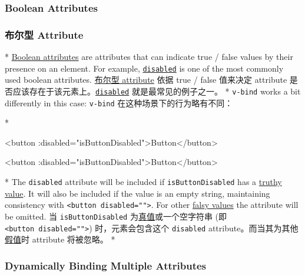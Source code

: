 \begin{paracol}{2}
\subsubsection{Boolean Attributes}
\switchcolumn
\subsubsection{布尔型 Attribute}
\switchcolumn[0]*%
\href{https://html.spec.whatwg.org/multipage/common-microsyntaxes.html\#boolean-attributes}{Boolean
attributes} are attributes that can indicate true / false values by
their presence on an element. For example,
\href{https://developer.mozilla.org/en-US/docs/Web/HTML/Attributes/disabled}{\texttt{disabled}}
is one of the most commonly used boolean attributes.
\switchcolumn
\href{https://developer.mozilla.org/zh-CN/docs/Web/HTML/Attributes\#布尔值属性}{布尔型
attribute} 依据 true / false 值来决定 attribute
是否应该存在于该元素上。\href{https://developer.mozilla.org/en-US/docs/Web/HTML/Attributes/disabled}{\texttt{disabled}}
就是最常见的例子之一。
\switchcolumn[0]*%
\texttt{v-bind} works a bit differently in this case:
\switchcolumn
\texttt{v-bind} 在这种场景下的行为略有不同：

\switchcolumn[0]*%
\begin{codeHtml}
<button :disabled="isButtonDisabled">Button</button>
\end{codeHtml}  
\switchcolumn
\begin{codeHtml}
<button :disabled="isButtonDisabled">Button</button>
\end{codeHtml}  
\switchcolumn[0]*%
The \texttt{disabled} attribute will be included if
\texttt{isButtonDisabled} has a
\href{https://developer.mozilla.org/en-US/docs/Glossary/Truthy}{truthy
value}. It will also be included if the value is an empty string,
maintaining consistency with
\texttt{\textless{}button\ disabled=""\textgreater{}}. For other
\href{https://developer.mozilla.org/en-US/docs/Glossary/Falsy}{falsy
values} the attribute will be omitted.
\switchcolumn
当 \texttt{isButtonDisabled}
为\href{https://developer.mozilla.org/en-US/docs/Glossary/Truthy}{真值}或一个空字符串
(即 \texttt{\textless{}button\ disabled=""\textgreater{}})
时，元素会包含这个 \texttt{disabled}
attribute。而当其为其他\href{https://developer.mozilla.org/en-US/docs/Glossary/Falsy}{假值}时
attribute 将被忽略。
\switchcolumn[0]*%
\subsubsection{Dynamically Binding Multiple Attributes}
\switchcolumn

\end{paracol}
